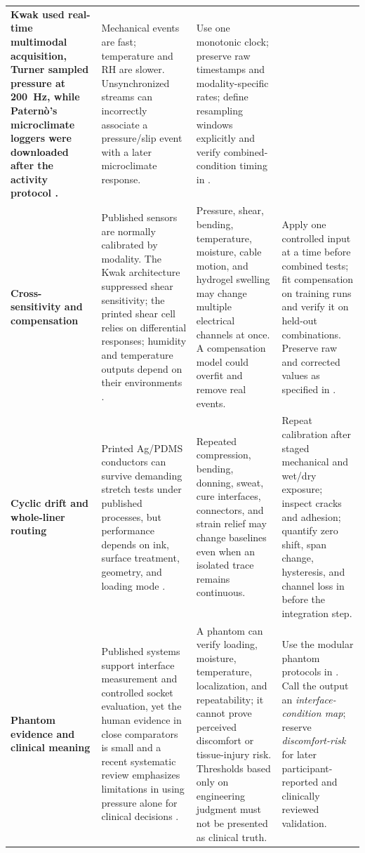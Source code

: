 \begin{tabularx}{\linewidth}{>{\raggedright\arraybackslash\bfseries\color{AUBRed}}p{2.35cm}Y Y Y}
Kwak used real-time multimodal acquisition, Turner sampled pressure at
200~Hz, while Patern\`o's microclimate loggers were downloaded after the
activity protocol \cite{q3kwak2020,q3turner2021,paterno2020}. &
Mechanical events are fast; temperature and RH are slower. Unsynchronized
streams can incorrectly associate a pressure/slip event with a later
microclimate response. &
Use one monotonic clock; preserve raw timestamps and modality-specific rates;
define resampling windows explicitly and verify combined-condition timing in
. \\
Cross-sensitivity and compensation &
Published sensors are normally calibrated by modality. The Kwak architecture
suppressed shear sensitivity; the printed shear cell relies on differential
responses; humidity and temperature outputs depend on their environments
\cite{q3kwak2020,albrecht2019,aitmammar2020,jager2022}. &
Pressure, shear, bending, temperature, moisture, cable motion, and hydrogel
swelling may change multiple electrical channels at once. A compensation
model could overfit and remove real events. &
Apply one controlled input at a time before combined tests; fit compensation
on training runs and verify it on held-out combinations. Preserve raw and
corrected values as specified in
. \\
Cyclic drift and whole-liner routing &
Printed Ag/PDMS conductors can survive demanding stretch tests under published
processes, but performance depends on ink, surface treatment, geometry, and
loading mode \cite{albrecht2018stretch,sun2016,q4abukhalaf2018}. &
Repeated compression, bending, donning, sweat, cure interfaces, connectors, and
strain relief may change baselines even when an isolated trace remains
continuous. &
Repeat calibration after staged mechanical and wet/dry exposure; inspect
cracks and adhesion; quantify zero shift, span change, hysteresis, and channel
loss in  before the
 integration step. \\
Phantom evidence and clinical meaning &
Published systems support interface measurement and controlled socket
evaluation, yet the human evidence in close comparators is small and a recent
systematic review emphasizes limitations in using pressure alone for clinical
decisions \cite{q3kwak2020,paterno2020,q3armitage2026}. &
A phantom can verify loading, moisture, temperature, localization, and
repeatability; it cannot prove perceived discomfort or tissue-injury risk.
Thresholds based only on engineering judgment must not be presented as
clinical truth. &
Use the modular phantom protocols in
. Call the output an
\emph{interface-condition map}; reserve \emph{discomfort-risk} for later
participant-reported and clinically reviewed validation. \\
\end{tabularx}
\endgroup

